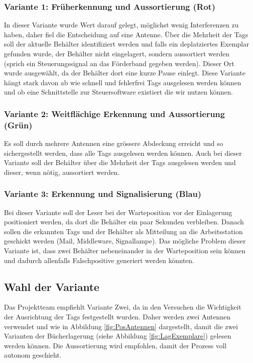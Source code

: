 \subsubsection{Variante 1: Früherkennung und Aussortierung (Rot)}
In dieser Variante wurde Wert darauf gelegt, möglichst wenig Interferenzen zu haben, daher fiel die Entscheidung auf eine Antenne. Über die Mehrheit der Tags soll der aktuelle Behälter identifiziert werden und falls ein deplatziertes Exemplar gefunden wurde, der Behälter nicht eingelagert, sondern aussortiert werden (sprich ein Steuerungssignal an das Förderband gegeben werden). Dieser Ort wurde ausgewählt, da der Behälter dort eine kurze Pause einlegt. Diese Variante hängt stark davon ab wie schnell und fehlerfrei Tags ausgelesen werden können und ob eine Schnittstelle zur Steuersoftware existiert die wir nutzen können.

\subsubsection{Variante 2: Weitflächige Erkennung und Aussortierung (Grün)}
Es soll durch mehrere Antennen eine grössere Abdeckung erreicht und so sichergestellt werden, dass alle Tags ausgelesen werden können. Auch bei dieser Variante soll der Behälter über die Mehrheit der Tags ausgelesen werden und dieser, wenn nötig, aussortiert werden.

\subsubsection{Variante 3: Erkennung und Signalisierung (Blau)}
Bei dieser Variante soll der Leser bei der Warteposition vor der Einlagerung positioniert werden, da dort die Behälter ein paar Sekunden verbleiben. Danach sollen die erkannten Tags und der Behälter als Mitteilung an die Arbeitsstation geschickt werden (Mail, Middleware, Signallampe). Das mögliche Problem dieser Variante ist, dass zwei Behälter nebeneinander in der Warteposition sein können und dadurch allenfalls Falschpositive generiert werden könnten.

\subsection{Wahl der Variante}

Das Projektteam empfiehlt Variante Zwei, da in den Versuchen die Wichtigkeit der Ausrichtung der Tags festgestellt wurden. Daher werden zwei Antennen verwendet und wie in Abbildung \ref{fig:PosAntennen} dargestellt, damit die zwei Varianten der Bücherlagerung (siehe Abbildung \ref{fig:LagExemplare}) gelesen werden können. Die Aussortierung wird empfohlen, damit der Prozess voll autonom geschieht.

